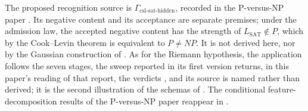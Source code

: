 The proposed recognition source is
\(\Gamma_{\mathrm{csl\text{-}sat\text{-}hidden}}\), recorded in the
P-versus-NP paper \cite{Tsiokos2026PvNP}.  Its negative content and its acceptance are
separate premises; under the admission law, the accepted negative
content has the strength of \(L_{\mathrm{SAT}}\notin P\), which by the
Cook--Levin theorem \cite{Cook1971NPCompleteness} is equivalent to
\(P\neq NP\).  It is not
derived here, nor by the Gaussian construction of
.  As for the Riemann hypothesis, the
application follows the seven stages, the sweep reported in its first
version \cite{Tsiokos2026PvNPvOne} returns, in this paper's reading of
that report, the verdicts \SigPattern, and its source is named rather than derived; it is the
second illustration of the schemas of .  The
conditional feature-decomposition results of the P-versus-NP paper
reappear in .


